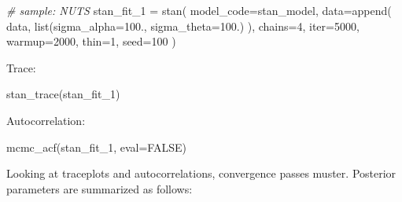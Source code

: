 \documentclass[
]{article}
\newenvironment{Shaded}{\begin{snugshade}}{\end{snugshade}}
\newcommand{\AttributeTok}[1]{\textcolor[rgb]{0.77,0.63,0.00}{#1}}
\newcommand{\CommentTok}[1]{\textcolor[rgb]{0.56,0.35,0.01}{\textit{#1}}}
\newcommand{\ConstantTok}[1]{\textcolor[rgb]{0.00,0.00,0.00}{#1}}
\newcommand{\DecValTok}[1]{\textcolor[rgb]{0.00,0.00,0.81}{#1}}
\newcommand{\FloatTok}[1]{\textcolor[rgb]{0.00,0.00,0.81}{#1}}
\newcommand{\FunctionTok}[1]{\textcolor[rgb]{0.00,0.00,0.00}{#1}}
\newcommand{\NormalTok}[1]{#1}
\newcommand{\OtherTok}[1]{\textcolor[rgb]{0.56,0.35,0.01}{#1}}
\newcommand{\SpecialCharTok}[1]{\textcolor[rgb]{0.00,0.00,0.00}{#1}}
\begin{document}
\begin{Shaded}
\begin{Highlighting}[]
\CommentTok{\# sample: NUTS}
\NormalTok{stan\_fit\_1 }\OtherTok{=} \FunctionTok{stan}\NormalTok{(}
  \AttributeTok{model\_code=}\NormalTok{stan\_model,}
  \AttributeTok{data=}\FunctionTok{append}\NormalTok{(}
\NormalTok{    data,}
    \FunctionTok{list}\NormalTok{(}\AttributeTok{sigma\_alpha=}\FloatTok{100.}\NormalTok{, }\AttributeTok{sigma\_theta=}\FloatTok{100.}\NormalTok{)}
\NormalTok{  ),}
  \AttributeTok{chains=}\DecValTok{4}\NormalTok{,}
  \AttributeTok{iter=}\DecValTok{5000}\NormalTok{,}
  \AttributeTok{warmup=}\DecValTok{2000}\NormalTok{,}
  \AttributeTok{thin=}\DecValTok{1}\NormalTok{,}
  \AttributeTok{seed=}\DecValTok{100}
\NormalTok{)}
\end{Highlighting}
\end{Shaded}

Trace:

\begin{Shaded}
\begin{Highlighting}[]
\FunctionTok{stan\_trace}\NormalTok{(stan\_fit\_1)}
\end{Highlighting}
\end{Shaded}

Autocorrelation:

\begin{Shaded}
\begin{Highlighting}[]
\FunctionTok{mcmc\_acf}\NormalTok{(stan\_fit\_1, }\AttributeTok{eval=}\ConstantTok{FALSE}\NormalTok{)}
\end{Highlighting}
\end{Shaded}

Looking at traceplots and autocorrelations, convergence passes muster.
Posterior parameters are summarized as follows:

\begin{Shaded}
\end{Shaded}
\end{document}
